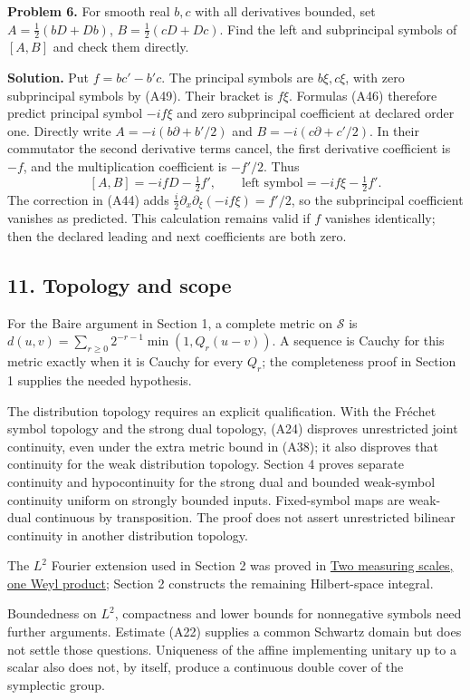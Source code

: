 \documentclass[
  11pt,
]{article}
\begin{document}
\textbf{Problem 6.} For smooth real \(b,c\) with all derivatives
bounded, set \(A=\frac12(bD+Db)\), \(B=\frac12(cD+Dc)\). Find the left
and subprincipal symbols of \([A,B]\) and check them directly.

\textbf{Solution.} Put \(f=bc'-b'c\). The principal symbols are
\(b\xi,c\xi\), with zero subprincipal symbols by (A49). Their bracket is
\(f\xi\). Formulas (A46) therefore predict principal symbol \(-if\xi\)
and zero subprincipal coefficient at declared order one. Directly write
\(A=-i(b\partial+b'/2)\) and \(B=-i(c\partial+c'/2)\). In their
commutator the second derivative terms cancel, the first derivative
coefficient is \(-f\), and the multiplication coefficient is \(-f'/2\).
Thus \[
[A,B]=-ifD-\tfrac12f',\qquad
\text{left symbol}=-if\xi-\tfrac12f'.
\tag{A51}
\] The correction in (A44) adds
\(\frac i2\partial_x\partial_\xi(-if\xi)=f'/2\), so the subprincipal
coefficient vanishes as predicted. This calculation remains valid if
\(f\) vanishes identically; then the declared leading and next
coefficients are both zero.

\subsection{11. Topology and scope}\label{topology-and-scope}

For the Baire argument in Section 1, a complete metric on \(\mathcal S\)
is \(d(u,v)=\sum_{r\ge0}2^{-r-1}\min(1,Q_r(u-v))\). A sequence is Cauchy
for this metric exactly when it is Cauchy for every \(Q_r\); the
completeness proof in Section 1 supplies the needed hypothesis.

The distribution topology requires an explicit qualification. With the
Fréchet symbol topology and the strong dual topology, (A24) disproves
unrestricted joint continuity, even under the extra metric bound in
(A38); it also disproves that continuity for the weak distribution
topology. Section 4 proves separate continuity and hypocontinuity for
the strong dual and bounded weak-symbol continuity uniform on strongly
bounded inputs. Fixed-symbol maps are weak-dual continuous by
transposition. The proof does not assert unrestricted bilinear
continuity in another distribution topology.

The \(L^2\) Fourier extension used in Section 2 was proved in
\href{weyl-metric-products.pdf}{Two measuring scales, one Weyl product};
Section 2 constructs the remaining Hilbert-space integral.

Boundedness on \(L^2\), compactness and lower bounds for nonnegative
symbols need further arguments. Estimate (A22) supplies a common
Schwartz domain but does not settle those questions. Uniqueness of the
affine implementing unitary up to a scalar also does not, by itself,
produce a continuous double cover of the symplectic group.
\end{document}
